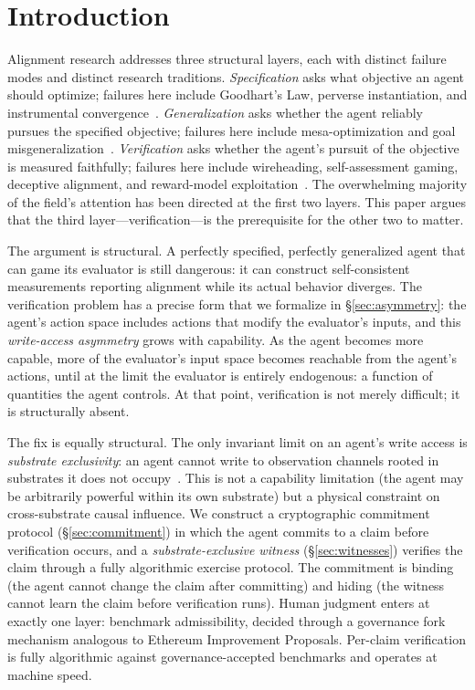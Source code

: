 \section{Introduction}
\label{sec:introduction}

Alignment research addresses three structural layers, each with distinct
failure modes and distinct research traditions.  \emph{Specification}
asks what objective an agent should optimize; failures here include
Goodhart's Law, perverse instantiation, and instrumental
convergence~\citep{bostrom2014superintelligence, omohundro2008basic}.
\emph{Generalization} asks whether the agent reliably pursues the
specified objective; failures here include mesa-optimization and goal
misgeneralization~\citep{hubinger2019risks}.  \emph{Verification} asks
whether the agent's pursuit of the objective is measured faithfully;
failures here include wireheading, self-assessment gaming, deceptive
alignment, and reward-model
exploitation~\citep{amodei2016concrete, gao2023scaling}.  The
overwhelming majority of the field's attention has been directed at the
first two layers.  This paper argues that the third layer---verification---is
the prerequisite for the other two to matter.

The argument is structural.  A perfectly specified, perfectly generalized
agent that can game its evaluator is still dangerous: it can construct
self-consistent measurements reporting alignment while its actual behavior
diverges.  The verification problem has a precise form that we formalize
in \S\ref{sec:asymmetry}: the agent's action space includes actions that
modify the evaluator's inputs, and this \emph{write-access asymmetry}
grows with capability.  As the agent becomes more capable, more of the
evaluator's input space becomes reachable from the agent's actions, until
at the limit the evaluator is entirely endogenous: a function of
quantities the agent controls.  At that point, verification is not
merely difficult; it is structurally absent.

The fix is equally structural.  The only invariant limit on an agent's
write access is \emph{substrate exclusivity}: an agent cannot write to
observation channels rooted in substrates it does not
occupy~\citep{lasser2026horizon, lasser2026scm}.  This is not a
capability limitation (the agent may be arbitrarily powerful within its
own substrate) but a physical constraint on cross-substrate causal
influence.  We construct a cryptographic commitment protocol
(\S\ref{sec:commitment}) in which the agent commits to a claim before
verification occurs, and a \emph{substrate-exclusive witness}
(\S\ref{sec:witnesses}) verifies the claim through a fully algorithmic
exercise protocol.  The commitment is binding (the agent cannot change
the claim after committing) and hiding (the witness cannot learn the
claim before verification runs).  Human judgment enters at exactly one
layer: benchmark admissibility, decided through a governance fork
mechanism analogous to Ethereum Improvement Proposals.  Per-claim
verification is fully algorithmic against governance-accepted benchmarks
and operates at machine speed.

